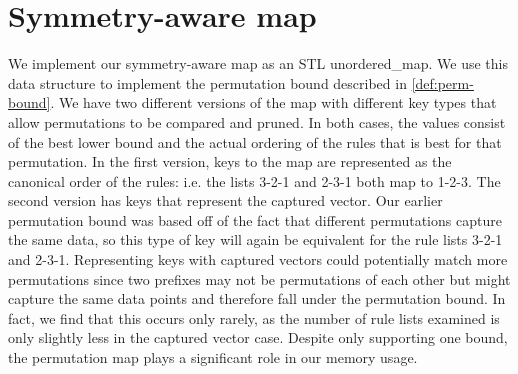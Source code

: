 \section{Symmetry-aware map}
We implement our symmetry-aware map as an STL unordered\_map.
We use this data structure to implement the permutation bound described in \ref{def:perm-bound}.
We have two different versions of the map with different key types that allow permutations to be compared and pruned.
In both cases, the values consist of the best lower bound and the actual ordering of the rules that is best for that permutation.
In the first version, keys to the map are represented as the canonical order of the rules: i.e. the lists 3-2-1 and 2-3-1 both map to 1-2-3.
The second version has keys that represent the captured vector.
Our earlier permutation bound was based off of the fact that different permutations capture the same data, so this type of key will again be equivalent for the rule lists 3-2-1 and 2-3-1.
Representing keys with captured vectors could potentially match more permutations since two prefixes may not be permutations of each other but might capture the same data points and therefore fall under the permutation bound.
In fact, we find that this occurs only rarely, as the number of rule lists examined is only slightly less in the captured vector case.
Despite only supporting one bound, the permutation map plays a significant role in our memory usage.

